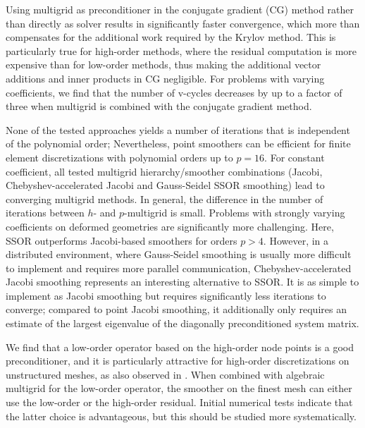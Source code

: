 \documentclass[smallcondensed,final]{svjour3}     %
\begin{document}
Using multigrid as preconditioner in the conjugate gradient (CG)
method rather than directly as solver results in significantly faster
convergence, which more than compensates for the additional work
required by the Krylov method.  This is particularly true for
high-order methods, where the residual computation is more expensive
than for low-order methods, thus making the additional vector
additions and inner products in CG negligible.  For problems with
varying coefficients, we find that the number of v-cycles
decreases by up to a factor of three when multigrid is combined with
the conjugate gradient method.

None of the tested approaches yields a number of iterations that is
independent of the polynomial order; Nevertheless, point smoothers can
be efficient for finite element discretizations with polynomial orders
up to $p=16$.  For constant coefficient, all tested multigrid
hierarchy/smoother combinations (Jacobi, Chebyshev-accelerated Jacobi
and Gauss-Seidel SSOR smoothing) lead to converging multigrid
methods. In general, the difference in the number of iterations
between $h$- and $p$-multigrid is small.
Problems with strongly varying coefficients on deformed
geometries are significantly more challenging. Here, SSOR outperforms
Jacobi-based smoothers for orders $p>4$. However, in a distributed
environment, where Gauss-Seidel smoothing is usually more difficult to
implement and requires more parallel communication,
Chebyshev-accelerated Jacobi smoothing represents an interesting
alternative to SSOR. It is as simple to implement as Jacobi smoothing
but requires significantly less iterations to converge; compared to
point Jacobi smoothing, it additionally only requires an estimate of
the largest eigenvalue of the diagonally preconditioned system matrix.


We find that a low-order operator based on the high-order node points
is a good preconditioner, and it is particularly attractive for
high-order discretizations on unstructured meshes, as also observed in
\cite{Brown10, DevilleMund90, HeysManteuffelMcCormickEtAl05}.  When
combined with algebraic multigrid for the low-order operator, the
smoother on the finest mesh can either use the low-order or the
high-order residual. Initial numerical tests indicate that the latter
choice is advantageous, but this should be studied more systematically.




\end{document}
